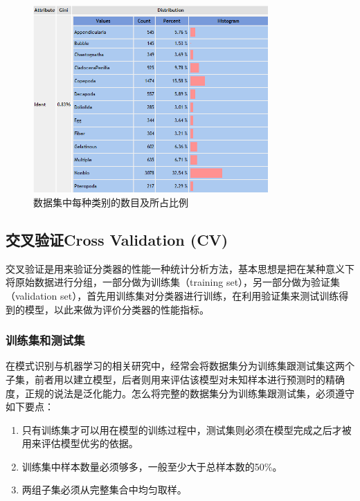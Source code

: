 \documentclass[12pt]{article}
\begin{document}
\begin{itemize}
\end{itemize}

\begin{figure}[!ht]
\centering
\includegraphics[width=0.8\textwidth]{每个类别所占比例.png}
\caption{数据集中每种类别的数目及所占比例}
\label{fig: ratio}
\end{figure} 

\subsection{交叉验证Cross Validation (CV)}
\label{cv}
交叉验证是用来验证分类器的性能一种统计分析方法，基本思想是把在某种意义下将原始数据进行分组，一部分做为训练集（training set），另一部分做为验证集（validation set），首先用训练集对分类器进行训练，在利用验证集来测试训练得到的模型，以此来做为评价分类器的性能指标。
\subsubsection{训练集和测试集}

在模式识别与机器学习的相关研究中，经常会将数据集分为训练集跟测试集这两个子集，前者用以建立模型，后者则用来评估该模型对未知样本进行预测时的精确度，正规的说法是泛化能力。怎么将完整的数据集分为训练集跟测试集，必须遵守如下要点：
\begin{enumerate}
    \item 只有训练集才可以用在模型的训练过程中，测试集则必须在模型完成之后才被用来评估模型优劣的依据。
    \item 训练集中样本数量必须够多，一般至少大于总样本数的50\%。
    \item 两组子集必须从完整集合中均匀取样。
\end{enumerate}
\end{document}
